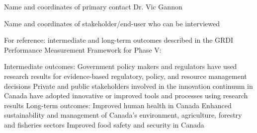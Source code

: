 Name and coordinates of primary contact
Dr. Vic Gannon



Name and coordinates of stakeholder/end-user who can be interviewed

For reference: intermediate and long-term outcomes described in the GRDI Performance Measurement Framework for Phase V:

Intermediate outcomes:
Government policy makers and regulators have used research results for evidence-based regulatory, policy, and resource management decisions
Private and public stakeholders involved in the innovation continuum in Canada have adopted innovative or improved tools and processes using research results
Long-term outcomes:
Improved human health in Canada
Enhanced sustainability and management of Canada’s environment, agriculture, forestry and fisheries sectors
Improved food safety and security in Canada
